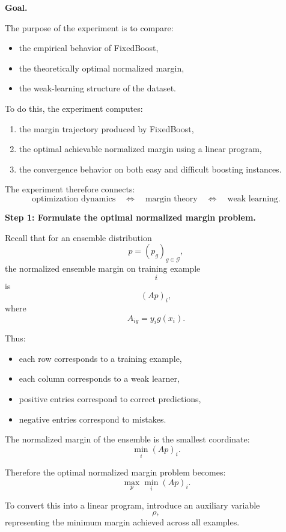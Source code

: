 \documentclass[11pt]{article}
\begin{document}
\begin{enumerate}
\begin{solutionbox}
\textbf{Goal.}

The purpose of the experiment is to compare:
\begin{itemize}
    \item the empirical behavior of FixedBoost,
    \item the theoretically optimal normalized margin,
    \item the weak-learning structure of the dataset.
\end{itemize}

To do this, the experiment computes:
\begin{enumerate}
    \item the margin trajectory produced by FixedBoost,
    \item the optimal achievable normalized margin using a linear program,
    \item the convergence behavior on both easy and difficult boosting instances.
\end{enumerate}

The experiment therefore connects:
\[
\text{optimization dynamics}
\quad\Longleftrightarrow\quad
\text{margin theory}
\quad\Longleftrightarrow\quad
\text{weak learning}.
\]

\medskip

\textbf{Step 1: Formulate the optimal normalized margin problem.}

Recall that for an ensemble distribution
\[
p=(p_g)_{g\in\mathcal G},
\]
the normalized ensemble margin on training example
\[
i
\]
is
\[
(Ap)_i,
\]
where
\[
A_{ig}=y_ig(x_i).
\]

Thus:
\begin{itemize}
    \item each row corresponds to a training example,
    \item each column corresponds to a weak learner,
    \item positive entries correspond to correct predictions,
    \item negative entries correspond to mistakes.
\end{itemize}

The normalized margin of the ensemble is the smallest coordinate:
\[
\min_i(Ap)_i.
\]

Therefore the optimal normalized margin problem becomes:
\[
\max_p\min_i(Ap)_i.
\]

To convert this into a linear program, introduce an auxiliary variable
\[
\rho,
\]
representing the minimum margin achieved across all examples.


\end{solutionbox}
\end{enumerate}
\end{document}
